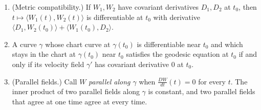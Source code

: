 \begin{lemma}
\begin{enumerate}
derivative
$$\frac{D(Z\circ\gamma)}{dt}(t_0)
=\partial_{v}\widehat Z(u(t_0))
+\Gamma\bigl(v,Z(\gamma(t_0))\bigr)(u(t_0)),
\qquad v=\dot u(t_0),$$
where $\widehat Z$ is the coordinate representation of $Z$ in the chart at
$\gamma(t_0)$. This value is the Levi-Civita covariant derivative of $Z$
in the direction of the velocity: for every smooth vector field $X$ on $M$
with $X(\gamma(t_0))=v$,
$$\frac{D(Z\circ\gamma)}{dt}(t_0)=\bigl(\nabla_XZ\bigr)(\gamma(t_0));$$
equivalently, at the centre $x$ of its own chart,
$$(\nabla_XZ)(x)=\partial_{X(x)}\widehat Z(\varphi(x))
+\Gamma\bigl(X(x),Z(x)\bigr)(\varphi(x)),$$
so that $(\nabla_XZ)(x)$ depends on $X$ only through $X(x)$. In
particular, a smooth field $Z$ with $\nabla Z\equiv0$ restricts to a
parallel field (in the sense of item (4)) along every curve that satisfies
the standing chart-regularity hypotheses at each time.
\item (Metric compatibility.) If $W_1,W_2$ have covariant derivatives
$D_1,D_2$ at $t_0$, then $t\mapsto\langle W_1(t),W_2(t)\rangle$ is
differentiable at $t_0$ with derivative
$\langle D_1,W_2(t_0)\rangle+\langle W_1(t_0),D_2\rangle$.
\item A curve $\gamma$ whose chart curve at $\gamma(t_0)$ is differentiable
near $t_0$ and which stays in the chart at $\gamma(t_0)$ near $t_0$
satisfies the geodesic equation at $t_0$ if and only if its velocity field
$\gamma'$ has covariant derivative $0$ at $t_0$.
\item (Parallel fields.) Call $W$ \emph{parallel along $\gamma$} when
$\frac{DW}{dt}(t)=0$ for every $t$. The inner product of two parallel
fields along $\gamma$ is constant, and two parallel fields that agree at
one time agree at every time.
\end{enumerate}
\end{lemma}

